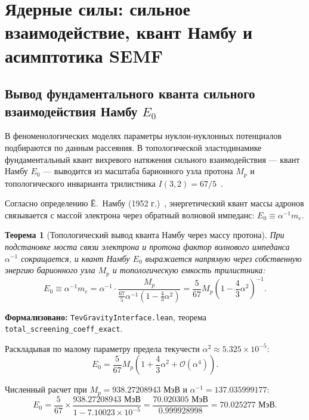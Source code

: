 \documentclass[11pt,a4paper]{article}
\newtheorem{theorem}{Теорема}
\theoremstyle{definition}
\theoremstyle{remark}
\begin{document}
\section{Ядерные силы: сильное взаимодействие, квант Намбу и асимптотика SEMF}

\subsection{Вывод фундаментального кванта сильного взаимодействия Намбу $E_0$}

В феноменологических моделях параметры нуклон-нуклонных потенциалов подбираются по данным рассеяния. В топологической эластодинамике фундаментальный квант вихревого натяжения сильного взаимодействия — квант Намбу $E_0$ — выводится из масштаба барионного узла протона $M_p$ и топологического инварианта трилистника $I(3,2) = 67/5$~\cite{Nambu1973}.

Согласно определению Ё.~Намбу (1952 г.)~\cite{Nambu1952}, энергетический квант массы адронов связывается с массой электрона через обратный волновой импеданс: $E_0 \equiv \alpha^{-1} m_e$.

\begin{theorem}[Топологический вывод кванта Намбу через массу протона]
\label{thm:nambu_quantum_derivation}
При подстановке моста связи электрона и протона фактор волнового импеданса $\alpha^{-1}$ сокращается, и квант Намбу $E_0$ выражается напрямую через собственную энергию барионного узла $M_p$ и топологическую емкость трилистника:
\begin{equation}
	E_0 \equiv \alpha^{-1} m_e = \alpha^{-1} \cdot \frac{M_p}{\frac{67}{5} \alpha^{-1} \left( 1 - \frac{4}{3}\alpha^2 \right)} = \frac{5}{67} M_p \left( 1 - \frac{4}{3}\alpha^2 \right)^{-1}.
\label{eq:nambu_quantum_exact}
\end{equation}
\end{theorem}

\noindent\small\textbf{Формализовано:} \texttt{TevGravityInterface.lean}, теорема \texttt{total_screening_coeff_exact}.

Раскладывая по малому параметру предела текучести $\alpha^2 \approx 5.325 \times 10^{-5}$:
\begin{equation}
	E_0 = \frac{5}{67} M_p \left( 1 + \frac{4}{3}\alpha^2 + \mathcal{O}(\alpha^4) \right).
	\label{eq:nambu_quantum_series}
\end{equation}

Численный расчет при $M_p = 938.27208943\text{ МэВ}$ и $\alpha^{-1} = 137.035999177$:
\begin{equation}
	E_0 = \frac{5}{67} \times \frac{938.27208943\text{ МэВ}}{1 - 7.10023 \times 10^{-5}} = \frac{70.020305\text{ МэВ}}{0.999928998} = 70.025277\text{ МэВ}.
	\label{eq:nambu_quantum_val}
\end{equation}
\end{document}
